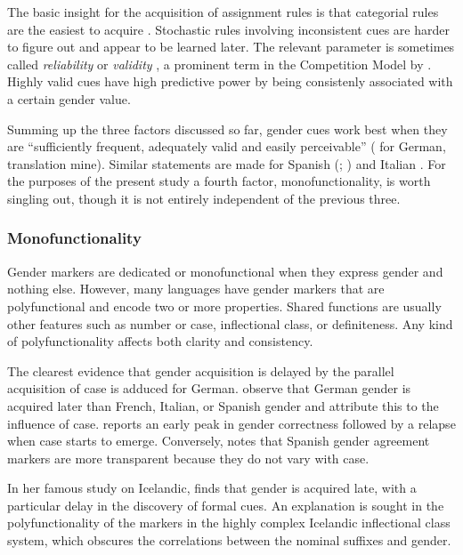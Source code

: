 \documentclass[output=collectionpaper]{langsci/langscibook}
\begin{document}
The basic insight for the acquisition of assignment rules is that categorial rules are the easiest to acquire \citep[114]{Mills1986}. Stochastic rules involving inconsistent cues are harder to figure out and appear to be learned later. The relevant parameter is sometimes called \textit{reliability} or \textit{validity} \citep{MacWhinney1978}, a prominent term in the Competition Model by \citet{MacWhinney1989}. Highly valid cues have high predictive power by being consistenly associated with a certain gender value.

Summing up the three factors discussed so far, gender cues work best when they are ``sufficiently frequent, adequately valid and easily perceivable'' (\citealt[68]{Wegener1995} for German, translation mine). Similar statements are made for Spanish (\citealt{Mariscal2009}; \citealt{PerezPereira1991}) and Italian \citep[545]{Pizzuto1992}. For the purposes of the present study a fourth factor, monofunctionality, is worth singling out, though it is not entirely independent of the previous three.

\subsubsection{Monofunctionality}
\label{sec:Audr:4.2.4}

Gender markers are dedicated or monofunctional when they express gender and nothing else. However, many languages have gender markers that are polyfunctional and encode two or more properties. Shared functions are usually other features such as number or case, inflectional class, or definiteness. Any kind of polyfunctionality affects both clarity and consistency.

The clearest evidence that gender acquisition is delayed by the parallel acquisition of case is adduced for German. \citet{Eichler2013} observe that German gender is acquired later than French, Italian, or Spanish gender and attribute this to the influence of case. \citet{Bewer2004} reports an early peak in gender correctness followed by a relapse when case starts to emerge. Conversely, \citet{PerezPereira1991} notes that Spanish gender agreement markers are more transparent because they do not vary with case.

In her famous study on Icelandic, \citet{Mulford1985} finds that gender is acquired late, with a particular delay in the discovery of formal cues. An explanation is sought in the polyfunctionality of the markers in the highly complex Icelandic inflectional class system, which obscures the correlations between the nominal suffixes and gender.
\end{document}
